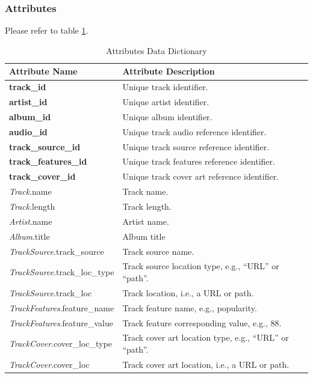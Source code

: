 \documentclass[12pt]{article}
\begin{document}
\subsubsection{Attributes}
Please refer to table \ref{tbl:attr-data-dict}.
\begin{table}[h!]
  \centering
  \begin{tabular}{ p{.35\linewidth} || p{.55\linewidth} }
    \textbf{Attribute Name} & \textbf{Attribute Description} \\
    \toprule
    \textbf{track\_id} & Unique track identifier. \\
    \midrule
    \textbf{artist\_id} & Unique artist identifier. \\
    \midrule
    \textbf{album\_id} & Unique album identifier. \\
    \midrule
    \textbf{audio\_id} & Unique track audio reference identifier. \\
    \midrule
    \textbf{track\_source\_id} & Unique track source reference identifier. \\
    \midrule
    \textbf{track\_features\_id} & Unique track features reference identifier. \\
    \midrule
    \textbf{track\_cover\_id} & Unique track cover art reference identifier. \\
    \midrule
    \emph{Track}.name & Track name. \\
    \midrule
    \emph{Track}.length & Track length. \\
    \midrule
    \emph{Artist}.name & Artist name. \\
    \midrule
    \emph{Album}.title & Album title \\
    \midrule
    \emph{TrackSource}.track\_source & Track source name. \\
    \midrule
    \emph{TrackSource}.track\_loc\_type & Track source location type, e.g., ``URL'' or ``path''. \\
    \midrule
    \emph{TrackSource}.track\_loc & Track location, i.e., a URL or path. \\
    \midrule
    \emph{TrackFeatures}.feature\_name & Track feature name, e.g., popularity. \\
    \midrule
    \emph{TrackFeatures}.feature\_value & Track feature corresponding value, e.g., 88. \\
    \midrule
    \emph{TrackCover}.cover\_loc\_type & Track cover art location type, e.g., ``URL'' or ``path''. \\
    \midrule
    \emph{TrackCover}.cover\_loc & Track cover art location, i.e., a URL or path.
  \end{tabular}
  \label{tbl:attr-data-dict}
  \caption{Attributes Data Dictionary}
\end{table}
\end{document}
